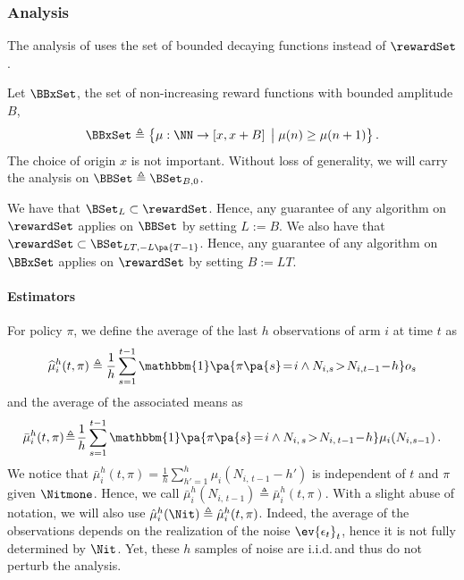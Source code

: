 \subsubsection*{Analysis}

The analysis of \citet{levine2017rotting} uses the set of bounded decaying functions instead of $\rewardSet$. 

\begin{definition}\label{def:rew-bounded} 
Let $\BBxSet$, the set of non-increasing reward functions with bounded amplitude $B$,
\[ 
\BBxSet \triangleq \left\{ \mu: \NN \rightarrow \left[x , x +B\right] \;\big{|}\; \mu(n) \geq \mu(n+1)  \right\}.
\]
The choice of origin $x$ is not important. Without loss of generality, we will carry the analysis on $\BBSet \triangleq \BSet_{B,0}$. 
\end{definition}
\begin{remark}
We have that $\BSet_L \subset \rewardSet$. Hence, any guarantee of any algorithm on $\rewardSet$ applies on $\BBSet$ by setting $L := B$. We also have that $\rewardSet \subset \BSet_{LT, -L\pa{T-1}}$. Hence, any guarantee of any algorithm on $\BBxSet$ applies on $\rewardSet$ by setting $B := LT$.
\end{remark}

\paragraph{Estimators}  
For policy $\pi$, we define the average of the last $h$ observations of arm $i$ at time $t$ as
\begin{equation}
\label{eq:def-hmu}
\widehat{\mu}_i^h(t,\pi) \triangleq \frac{1}{h}\sum_{s=1}^{t-1} \mathbbm{1}\pa{\pi\pa{s}\! =\! i \land N_{i,s}\!>\! N_{i,t-1}\! -\! h } o_{s}
\end{equation}
and the average of the associated means as
\begin{equation}
\label{eq:def-bmu}
\bar{\mu}_i^h(t,\pi) \!\triangleq\! \frac{1}{h}\sum_{s=1}^{t-1} \mathbbm{1}\pa{\pi\pa{s}\! =\! i \land N_{i,\,s}\!>\! N_{i,\,t-1}\! -\! h } \mu_{i}(N_{i,s-1})\,.
\end{equation}
%
We notice that $\bar{\mu}_i^h(t,\pi) = \frac{1}{h}\sum_{h'=1}^{h} \mu_i(N_{i,\,t-1}-h')$ is independent of $t$ and $\pi$ given $\Nitmone$. Hence, we call $\bar{\mu}_i^h(N_{i,\,t-1}) \triangleq \bar{\mu}_i^h(t,\pi)$. With a slight abuse of notation, we will also use $\hat{\mu}_i^h(\Nit) \triangleq \hat{\mu}_i^h(t,\pi)$. Indeed, the average of the observations depends on the realization of the noise $\ev{\epsilon_t}_t$, hence it is not fully determined by $\Nit$. Yet, these $h$ samples of noise are i.i.d.\,and thus do not perturb the analysis. 
\pagebreak
